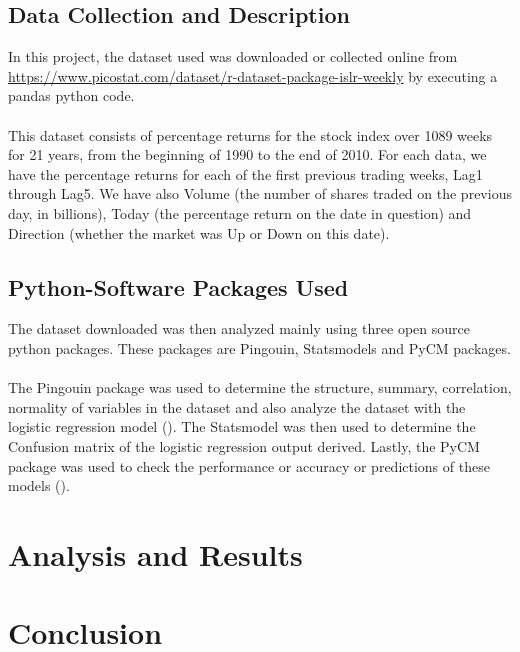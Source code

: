 \documentclass[12pt]{article}
\begin{document}
\subsection{Data Collection and Description}
In this project, the dataset used was downloaded or collected online from \url{https://www.picostat.com/dataset/r-dataset-package-islr-weekly} by executing a pandas python code. \\\\
This dataset consists of percentage returns for the stock index over 1089 weeks for 21 years, from the beginning of 1990 to the end of 2010.  For each data,  we have the percentage returns for each of the  first previous trading weeks, Lag1 through Lag5.  We have also Volume (the number of shares traded on the previous day, in billions), Today (the percentage return on the date in question) and Direction (whether the market was Up or Down on this date). 

\subsection{Python-Software Packages Used}
The dataset downloaded was then analyzed mainly using three open source python packages. These packages are Pingouin, Statsmodels and PyCM packages. \\\\
The Pingouin package was used to determine the structure, summary, correlation, normality of variables in the dataset and also analyze the dataset with the logistic regression model (\cite{ref-software}). The Statsmodel was then used to determine the Confusion matrix of the logistic regression output derived. Lastly, the PyCM package was used to check the performance or accuracy or predictions of these models (\cite{ref-softwaree}).



\section{Analysis and Results}







\section{Conclusion}
\end{document}
